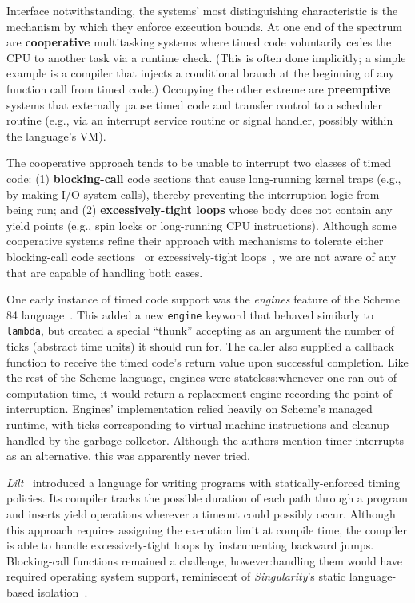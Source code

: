 Interface notwithstanding, the systems' most distinguishing
characteristic is the mechanism by which they enforce execution bounds.  At one end
of the spectrum are \textbf{cooperative} multitasking systems where
timed code voluntarily cedes the CPU to another
task via a runtime check.  (This is often done implicitly; a simple example is a
compiler that injects a conditional branch
at the beginning of any function call from timed code.)
Occupying the other extreme are \textbf{preemptive} systems that externally
pause timed code and transfer control to a scheduler routine (e.g., via
an interrupt service routine or signal handler, possibly within the language's VM).

The cooperative approach tends to be unable to interrupt two classes of timed code:\@
(1) \textbf{blocking-call} code sections that cause
long-running kernel traps (e.g., by making I/O system calls),
thereby preventing the interruption logic from being run; and (2)
\textbf{excessively-tight loops} whose body does not contain any yield points (e.g.,
spin locks or long-running CPU instructions).
Although some cooperative systems refine their approach with mechanisms
to tolerate either blocking-call code sections~\cite{www-golang} or excessively-tight
loops~\cite{vanderwaart:cmucs2006}, we are not aware of any that are capable of
handling both
cases.

One early instance of timed code support was the \textit{engines} feature of
the Scheme 84 language~\cite{haynes:iucs1984}.  This added a new \texttt{engine}
keyword that behaved similarly to \texttt{lambda}, but created a special ``thunk''
accepting as an argument the number of ticks (abstract time units) it should run for.
The caller also supplied a callback function to receive the
timed code's return value upon successful completion.  Like the rest of the
Scheme language, engines were stateless:\@ whenever one ran out of computation time,
it would return a replacement engine recording the point of interruption.  Engines'
implementation relied heavily on Scheme's managed runtime, with ticks
corresponding to virtual machine instructions and cleanup handled by the garbage
collector.  Although the authors mention timer interrupts as an
alternative, this was apparently never tried.

\textit{Lilt}~\cite{vanderwaart:cmucs2006} introduced a language for writing
programs with statically-enforced timing policies.
Its compiler tracks the possible duration of each path through a program and
inserts yield operations wherever a timeout could possibly occur.  Although this
approach requires assigning the execution limit at compile time, the compiler is able
to handle excessively-tight loops by instrumenting backward jumps.
Blocking-call functions remained a challenge, however:\@ handling them would have
required
operating system support, reminiscent of \textit{Singularity}'s static language-based
isolation~\cite{hunt:msr2005}.

